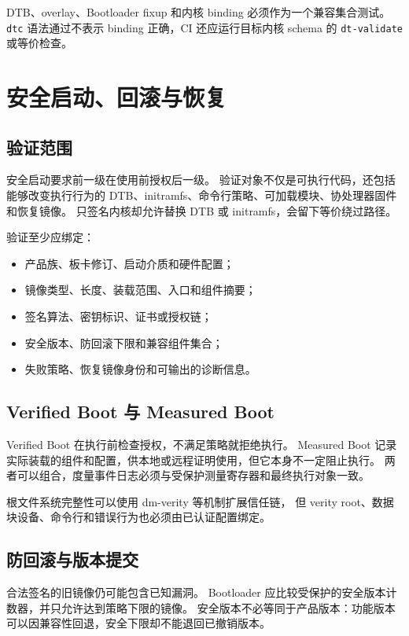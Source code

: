 DTB、overlay、Bootloader fixup 和内核 binding 必须作为一个兼容集合测试。
\texttt{dtc} 语法通过不表示 binding 正确，CI 还应运行目标内核 schema 的 \texttt{dt-validate} 或等价检查。

\section{安全启动、回滚与恢复}

\subsection{验证范围}

安全启动要求前一级在使用前授权后一级。
验证对象不仅是可执行代码，还包括能够改变执行行为的 DTB、initramfs、命令行策略、可加载模块、协处理器固件和恢复镜像。
只签名内核却允许替换 DTB 或 initramfs，会留下等价绕过路径。

验证至少应绑定：

\begin{itemize}
  \item 产品族、板卡修订、启动介质和硬件配置；
  \item 镜像类型、长度、装载范围、入口和组件摘要；
  \item 签名算法、密钥标识、证书或授权链；
  \item 安全版本、防回滚下限和兼容组件集合；
  \item 失败策略、恢复镜像身份和可输出的诊断信息。
\end{itemize}

\subsection{Verified Boot 与 Measured Boot}

Verified Boot 在执行前检查授权，不满足策略就拒绝执行。
Measured Boot 记录实际装载的组件和配置，供本地或远程证明使用，但它本身不一定阻止执行。
两者可以组合，度量事件日志必须与受保护测量寄存器和最终执行对象一致。

根文件系统完整性可以使用 dm-verity 等机制扩展信任链\cite{linux-dm-verity}，
但 verity root、数据块设备、命令行和错误行为也必须由已认证配置绑定。

\subsection{防回滚与版本提交}

合法签名的旧镜像仍可能包含已知漏洞。
Bootloader 应比较受保护的安全版本计数器，并只允许达到策略下限的镜像。
安全版本不必等同于产品版本：功能版本可以因兼容性回退，安全下限却不能退回已撤销版本。

